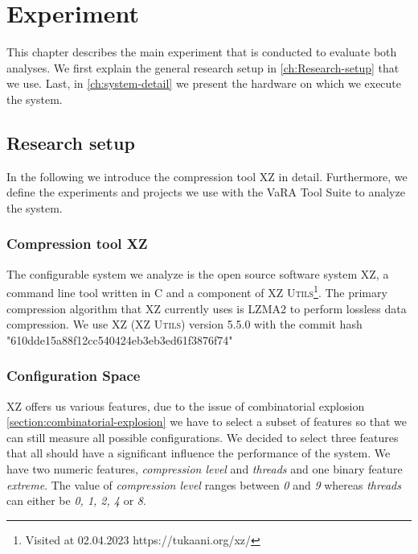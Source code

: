 \chapter{Experiment}\label{ch:experiment}

This chapter describes the main experiment that is conducted to evaluate both analyses.
We first explain the general research setup in \autoref{ch:Research-setup} that we use. 
Last, in \autoref{ch:system-detail} we present the hardware on which we execute the system.

\section{Research setup}\label{ch:Research-setup}

In the following we introduce the compression tool \textsc{XZ} in detail. Furthermore, we define the experiments and projects we use with 
the VaRA Tool Suite to analyze the system.

\subsection{Compression tool \textsc{XZ}}

The configurable system we analyze is the open source software system \textsc{XZ}, a command line tool written in \textsc{C} and a component of
\textsc{XZ Utils}\footnote{Visited at 02.04.2023 https://tukaani.org/xz/}.  
The primary compression algorithm that \textsc{XZ} currently uses is \textsc{LZMA2} to perform lossless data compression.
We use \textsc{XZ} \textsc{(XZ Utils)} version 5.5.0 with the commit hash "610dde15a88f12cc540424eb3eb3ed61f3876f74"

\subsection*{Configuration Space}
\textsc{XZ} offers us various features, due to the issue of combinatorial explosion \autoref{section:combinatorial-explosion} we 
have to select a subset of features so that we can still measure all possible configurations. We decided to select three features
that all should have a significant influence the performance of the system. We have two numeric features, \emph{compression level} and 
\emph{threads} and one binary feature \emph{extreme}. The value of \emph{compression level} ranges between \emph{0} and \emph{9} whereas \emph{threads} can either 
be \emph{0, 1, 2, 4} or \emph{8}. 

